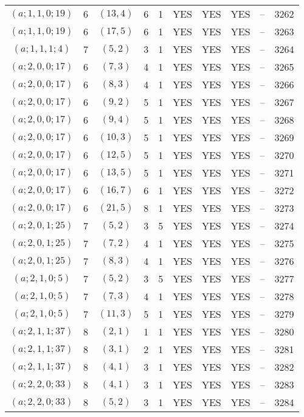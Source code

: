 \begin{longtable}{|c|c|c|c|c|c|c|c|c|c|}
$(a; 1, 1, 0; 19)$ & 6 & $(13, 4)$ & 6 & 1 & YES & YES & YES & -- & 3262\\
$(a; 1, 1, 0; 19)$ & 6 & $(17, 5)$ & 6 & 1 & YES & YES & YES & -- & 3263\\
$(a; 1, 1, 1; 4)$ & 7 & $(5, 2)$ & 3 & 1 & YES & YES & YES & -- & 3264\\
$(a; 2, 0, 0; 17)$ & 6 & $(7, 3)$ & 4 & 1 & YES & YES & YES & -- & 3265\\
$(a; 2, 0, 0; 17)$ & 6 & $(8, 3)$ & 4 & 1 & YES & YES & YES & -- & 3266\\
$(a; 2, 0, 0; 17)$ & 6 & $(9, 2)$ & 5 & 1 & YES & YES & YES & -- & 3267\\
$(a; 2, 0, 0; 17)$ & 6 & $(9, 4)$ & 5 & 1 & YES & YES & YES & -- & 3268\\
$(a; 2, 0, 0; 17)$ & 6 & $(10, 3)$ & 5 & 1 & YES & YES & YES & -- & 3269\\
$(a; 2, 0, 0; 17)$ & 6 & $(12, 5)$ & 5 & 1 & YES & YES & YES & -- & 3270\\
$(a; 2, 0, 0; 17)$ & 6 & $(13, 5)$ & 5 & 1 & YES & YES & YES & -- & 3271\\
$(a; 2, 0, 0; 17)$ & 6 & $(16, 7)$ & 6 & 1 & YES & YES & YES & -- & 3272\\
$(a; 2, 0, 0; 17)$ & 6 & $(21, 5)$ & 8 & 1 & YES & YES & YES & -- & 3273\\
$(a; 2, 0, 1; 25)$ & 7 & $(5, 2)$ & 3 & 5 & YES & YES & YES & -- & 3274\\
$(a; 2, 0, 1; 25)$ & 7 & $(7, 2)$ & 4 & 1 & YES & YES & YES & -- & 3275\\
$(a; 2, 0, 1; 25)$ & 7 & $(8, 3)$ & 4 & 1 & YES & YES & YES & -- & 3276\\
$(a; 2, 1, 0; 5)$ & 7 & $(5, 2)$ & 3 & 5 & YES & YES & YES & -- & 3277\\
$(a; 2, 1, 0; 5)$ & 7 & $(7, 3)$ & 4 & 1 & YES & YES & YES & -- & 3278\\
$(a; 2, 1, 0; 5)$ & 7 & $(11, 3)$ & 5 & 1 & YES & YES & YES & -- & 3279\\
$(a; 2, 1, 1; 37)$ & 8 & $(2, 1)$ & 1 & 1 & YES & YES & YES & -- & 3280\\
$(a; 2, 1, 1; 37)$ & 8 & $(3, 1)$ & 2 & 1 & YES & YES & YES & -- & 3281\\
$(a; 2, 1, 1; 37)$ & 8 & $(4, 1)$ & 3 & 1 & YES & YES & YES & -- & 3282\\
$(a; 2, 2, 0; 33)$ & 8 & $(4, 1)$ & 3 & 1 & YES & YES & YES & -- & 3283\\
$(a; 2, 2, 0; 33)$ & 8 & $(5, 2)$ & 3 & 1 & YES & YES & YES & -- & 3284\\

\end{longtable}
